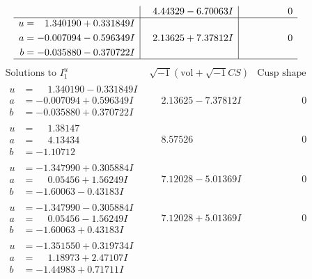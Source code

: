 \documentclass[1p]{elsarticle_modified}
\theoremstyle{definition}
\newcommand{\I}{\sqrt{-1}}
\begin{document}
$$\begin{array}{c|c|c}
 & \phantom{-}4.44329 - 6.70063 I & \phantom{-0.000000 } 0 \\ \hline\begin{aligned}
u &= \phantom{-}1.340190 + 0.331849 I \\
a &= -0.007094 - 0.596349 I \\
b &= -0.035880 - 0.370722 I\end{aligned}
 & \phantom{-}2.13625 + 7.37812 I & \phantom{-0.000000 } 0\\
 \hline 
 \end{array}$$\newpage$$\begin{array}{c|c|c}  
\text{Solutions to }I^u_{1}& \I (\text{vol} + \sqrt{-1}CS) & \text{Cusp shape}\\
 \hline 
\begin{aligned}
u &= \phantom{-}1.340190 - 0.331849 I \\
a &= -0.007094 + 0.596349 I \\
b &= -0.035880 + 0.370722 I\end{aligned}
 & \phantom{-}2.13625 - 7.37812 I & \phantom{-0.000000 } 0 \\ \hline\begin{aligned}
u &= \phantom{-}1.38147\phantom{ +0.000000I} \\
a &= \phantom{-}4.13434\phantom{ +0.000000I} \\
b &= -1.10712\phantom{ +0.000000I}\end{aligned}
 & \phantom{-}8.57526\phantom{ +0.000000I} & \phantom{-0.000000 } 0 \\ \hline\begin{aligned}
u &= -1.347990 + 0.305884 I \\
a &= \phantom{-}0.05456 + 1.56249 I \\
b &= -1.60063 - 0.43183 I\end{aligned}
 & \phantom{-}7.12028 - 5.01369 I & \phantom{-0.000000 } 0 \\ \hline\begin{aligned}
u &= -1.347990 - 0.305884 I \\
a &= \phantom{-}0.05456 - 1.56249 I \\
b &= -1.60063 + 0.43183 I\end{aligned}
 & \phantom{-}7.12028 + 5.01369 I & \phantom{-0.000000 } 0 \\ \hline\begin{aligned}
u &= -1.351550 + 0.319734 I \\
a &= \phantom{-}1.18973 + 2.47107 I \\
b &= -1.44983 + 0.71711 I\end{aligned}

\end{array}$$
\end{document}
